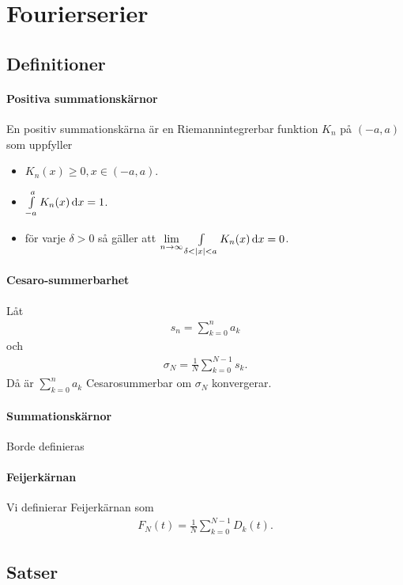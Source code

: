 \section{Fourierserier}

\subsection{Definitioner}

\paragraph{Positiva summationskärnor}
En positiv summationskärna är en Riemannintegrerbar funktion $K_{n}$ på $(-a, a)$ som uppfyller
\begin{itemize}
	\item $K_{n}(x)\geq 0, x\in (-a, a)$.
	\item $\int\limits_{-a}^{a}K_{n}(x)\dd{x} = 1$.
	\item för varje $\delta > 0$ så gäller att $\lim\limits_{n\to\infty}\int\limits_{\delta < \abs{x} < a}^{}K_{n}(x)\dd{x} = 0$.
\end{itemize}

\paragraph{Cesaro-summerbarhet}
Låt
\begin{align*}
	s_{n} = \sum\limits_{k = 0}^{n}a_{k}
\end{align*}
och
\begin{align*}
	\sigma_{N} = \frac{1}{N}\sum\limits_{k = 0}^{N - 1}s_{k}.
\end{align*}
Då är $\sum\limits_{k = 0}^{n}a_{k}$ Cesarosummerbar om $\sigma_{N}$ konvergerar.

\paragraph{Summationskärnor}
Borde definieras

\paragraph{Feijerkärnan}
Vi definierar Feijerkärnan som
\begin{align*}
	F_{N}(t) = \frac{1}{N}\sum\limits_{k = 0}^{N - 1}D_{k}(t).
\end{align*}

\subsection{Satser}

